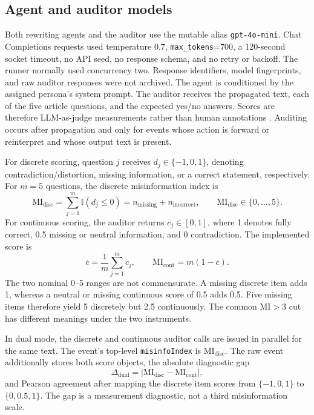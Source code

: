 \subsection{Agent and auditor models}
\label{subsec:simulation-model}

Both rewriting agents and the auditor use the mutable alias
\texttt{gpt-4o-mini}. Chat Completions requests used temperature \(0.7\),
\texttt{max\_tokens}=700, a 120-second socket timeout, no API seed, no response
schema, and no retry or backoff. The runner normally used concurrency two.
Response identifiers, model fingerprints, and raw auditor responses were not
archived. The agent is conditioned by the assigned persona's system prompt.
The auditor receives the
propagated text, each of the five article questions, and the expected yes/no
answers.  Scores are therefore LLM-as-judge measurements rather than human
annotations \parencite{zheng2023judge}.  Auditing occurs after propagation and
only for events whose action is forward or reinterpret and whose output text
is present.

For discrete scoring, question \(j\) receives
\(d_j\in\{-1,0,1\}\), denoting contradiction/distortion, missing information,
or a correct statement, respectively.  For \(m=5\) questions, the discrete
misinformation index is
\begin{equation}
  \mathrm{MI}_{\mathrm{disc}}
  = \sum_{j=1}^{m}\mathbb{I}(d_j\leq 0)
  = n_{\mathrm{missing}}+n_{\mathrm{incorrect}},
  \qquad \mathrm{MI}_{\mathrm{disc}}\in\{0,\ldots,5\}.
  \label{eq:mm-mi-discrete}
\end{equation}
For continuous scoring, the auditor returns
\(c_j\in[0,1]\), where 1 denotes fully correct, 0.5 missing or neutral
information, and 0 contradiction.  The implemented score is
\begin{equation}
  \overline{c}=\frac{1}{m}\sum_{j=1}^{m}c_j,
  \qquad
  \mathrm{MI}_{\mathrm{cont}}=m(1-\overline{c}).
  \label{eq:mm-mi-continuous}
\end{equation}
The two nominal 0--5 ranges are not commensurate. A missing discrete item adds
1, whereas a neutral or missing continuous score of 0.5 adds 0.5. Five
missing items therefore yield 5 discretely but 2.5 continuously. The common
\(\mathrm{MI}>3\) cut has different meanings under the two instruments.

In dual mode, the discrete and continuous auditor calls are issued in parallel
for the same text.  The event's top-level \texttt{misinfoIndex} is
\(\mathrm{MI}_{\mathrm{disc}}\).  The raw event additionally stores both score
objects, the absolute diagnostic gap
\begin{equation}
  \Delta_{\mathrm{dual}}
  =\left|\mathrm{MI}_{\mathrm{disc}}-\mathrm{MI}_{\mathrm{cont}}\right|,
  \label{eq:dual-gap}
\end{equation}
and Pearson agreement after mapping the discrete item scores from
\(\{-1,0,1\}\) to \(\{0,0.5,1\}\).  The gap is a measurement diagnostic, not a
third misinformation scale.

